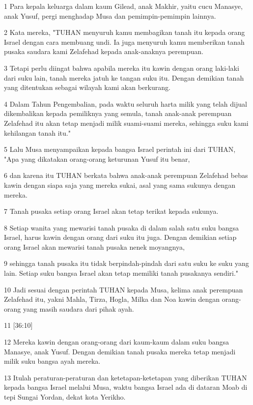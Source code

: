 \par 1 Para kepala keluarga dalam kaum Gilead, anak Makhir, yaitu cucu Manasye, anak Yusuf, pergi menghadap Musa dan pemimpin-pemimpin lainnya.
\par 2 Kata mereka, "TUHAN menyuruh kamu membagikan tanah itu kepada orang Israel dengan cara membuang undi. Ia juga menyuruh kamu memberikan tanah pusaka saudara kami Zelafehad kepada anak-anaknya perempuan.
\par 3 Tetapi perlu diingat bahwa apabila mereka itu kawin dengan orang laki-laki dari suku lain, tanah mereka jatuh ke tangan suku itu. Dengan demikian tanah yang ditentukan sebagai wilayah kami akan berkurang.
\par 4 Dalam Tahun Pengembalian, pada waktu seluruh harta milik yang telah dijual dikembalikan kepada pemiliknya yang semula, tanah anak-anak perempuan Zelafehad itu akan tetap menjadi milik suami-suami mereka, sehingga suku kami kehilangan tanah itu."
\par 5 Lalu Musa menyampaikan kepada bangsa Israel perintah ini dari TUHAN, "Apa yang dikatakan orang-orang keturunan Yusuf itu benar,
\par 6 dan karena itu TUHAN berkata bahwa anak-anak perempuan Zelafehad bebas kawin dengan siapa saja yang mereka sukai, asal yang sama sukunya dengan mereka.
\par 7 Tanah pusaka setiap orang Israel akan tetap terikat kepada sukunya.
\par 8 Setiap wanita yang mewarisi tanah pusaka di dalam salah satu suku bangsa Israel, harus kawin dengan orang dari suku itu juga. Dengan demikian setiap orang Israel akan mewarisi tanah pusaka nenek moyangnya,
\par 9 sehingga tanah pusaka itu tidak berpindah-pindah dari satu suku ke suku yang lain. Setiap suku bangsa Israel akan tetap memiliki tanah pusakanya sendiri."
\par 10 Jadi sesuai dengan perintah TUHAN kepada Musa, kelima anak perempuan Zelafehad itu, yakni Mahla, Tirza, Hogla, Milka dan Noa kawin dengan orang-orang yang masih saudara dari pihak ayah.
\par 11 [36:10]
\par 12 Mereka kawin dengan orang-orang dari kaum-kaum dalam suku bangsa Manasye, anak Yusuf. Dengan demikian tanah pusaka mereka tetap menjadi milik suku bangsa ayah mereka.
\par 13 Itulah peraturan-peraturan dan ketetapan-ketetapan yang diberikan TUHAN kepada bangsa Israel melalui Musa, waktu bangsa Israel ada di dataran Moab di tepi Sungai Yordan, dekat kota Yerikho.


